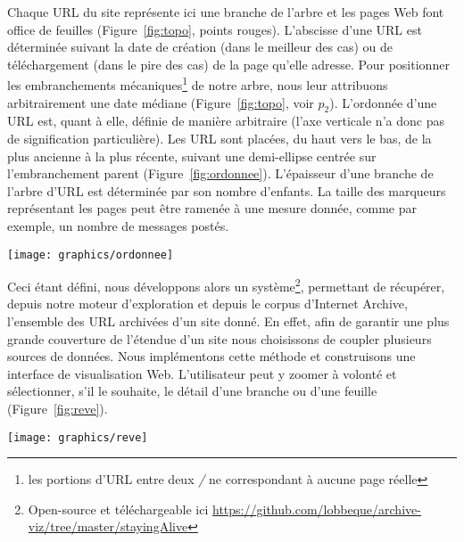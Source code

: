 \documentclass[symmetric,justified,marginals=raggedouter]{tufte-book}
\begin{document}
\noindent Chaque URL du site représente ici une branche de l'arbre et les pages Web font office de feuilles (Figure~\ref{fig:topo}, points rouges). L'abscisse d'une URL est déterminée suivant la date de création (dans le meilleur des cas) ou de téléchargement (dans le pire des cas) de la page qu'elle adresse. Pour positionner les embranchements mécaniques\footnote{\RaggedOuter les portions d'URL entre deux \textit{/} ne correspondant à aucune page réelle} de notre arbre, nous leur attribuons arbitrairement une date médiane (Figure~\ref{fig:topo}, voir $p_2$). L'ordonnée d'une URL est, quant à elle, définie de manière arbitraire (l'axe verticale n'a donc pas de signification particulière). Les URL sont placées, du haut vers le bas, de la plus ancienne à la plus récente, suivant une demi-ellipse centrée sur l'embranchement parent (Figure~\ref{fig:ordonnee}). L'épaisseur d'une branche de l'arbre d'URL est déterminée par son nombre d'enfants. La taille des marqueurs représentant les pages peut être ramenée à une mesure donnée, comme par exemple, un nombre de messages postés.

\begin{marginfigure}%
  \texttt{[image: graphics/ordonnee]}
  \vspace*{0.2cm}  
  \caption{Positionnement de 3 pages (rouge) autour d'un embranchement parent (bleu)}
  \label{fig:ordonnee}
\end{marginfigure} 

Ceci étant défini, nous développons alors un système\footnote{\RaggedOuter Open-source et téléchargeable ici \url{https://github.com/lobbeque/archive-viz/tree/master/stayingAlive}}, permettant de récupérer, depuis notre moteur d'exploration et depuis le corpus d'Internet Archive, l'ensemble des URL archivées d'un site donné. En effet, afin de garantir une plus grande couverture de l'étendue d'un site nous choisissons de coupler plusieurs sources de données. Nous implémentons cette méthode et construisons une interface de visualisation Web. L'utilisateur peut y zoomer à volonté et sélectionner, s'il le souhaite, le détail d'une branche ou d'une feuille (Figure~\ref{fig:reve}).\\

\begin{figure*}
  \texttt{[image: graphics/reve]}
  \caption{Capture d'écran de l'évolution topologique de la section \textit{Interprétation des rêves, roqya, djinn} du forum de \textit{yabiladi.com}}
  \label{fig:reve}
\end{figure*}
\end{document}
